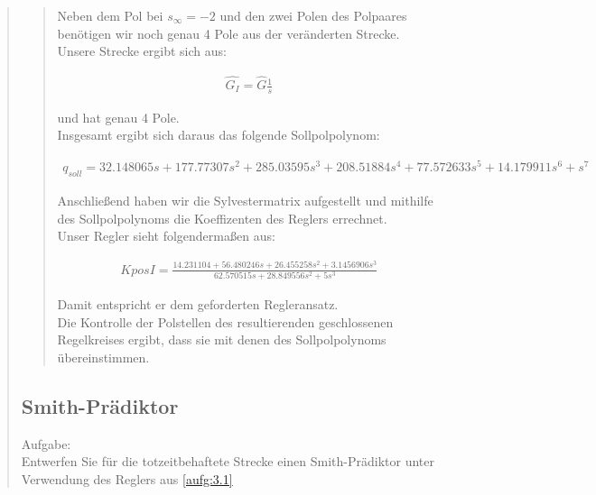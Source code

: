 \begin{quote}
\begin{quote}
        Neben dem Pol bei $s_\infty = -2$ und den zwei Polen des Polpaares benötigen wir noch genau 4 Pole aus der
        veränderten Strecke. Unsere Strecke ergibt sich aus:
        
        \begin{equation*}
        	\begin{split}
        		\hat{G_I} = \hat{G} \frac{1}{s}
        	\end{split}
        \end{equation*}
        
        und hat genau 4 Pole.\\
        
        Insgesamt ergibt sich daraus das folgende Sollpolpolynom:
        
        \begin{equation*}
        	\begin{split}
        		q_{soll} = 32.148065s + 177.77307s^2 + 285.03595s^3 + 208.51884s^4 + 77.572633s^5 + 14.179911s^6 + s^7  
        	\end{split}
        \end{equation*}
        \vspace{1em}
        
        Anschließend haben wir die Sylvestermatrix aufgestellt und mithilfe des Sollpolpolynoms die Koeffizenten des
        Reglers errechnet.\\
        Unser Regler sieht folgendermaßen aus:
        
        \begin{equation*}
        	\begin{split}
        		KposI = \frac{14.231104 +  56.480246s +  26.455258s^2 +  3.1456906s^3}{62.570515s +  28.849556s^2 +  5s^3}
        	\end{split}
        \end{equation*}
        
        Damit entspricht er dem geforderten Regleransatz.\\
        Die Kontrolle der Polstellen des resultierenden geschlossenen Regelkreises ergibt, dass sie mit denen des
        Sollpolpolynoms übereinstimmen.
    \end{quote}
    
    
    
    \subsection{Smith-Prädiktor}
    Aufgabe:\\
    Entwerfen Sie für die totzeitbehaftete Strecke einen Smith-Prädiktor unter Verwendung des Reglers aus
    \ref{aufg:3.1}\vspace{1em}
    

\end{quote}
